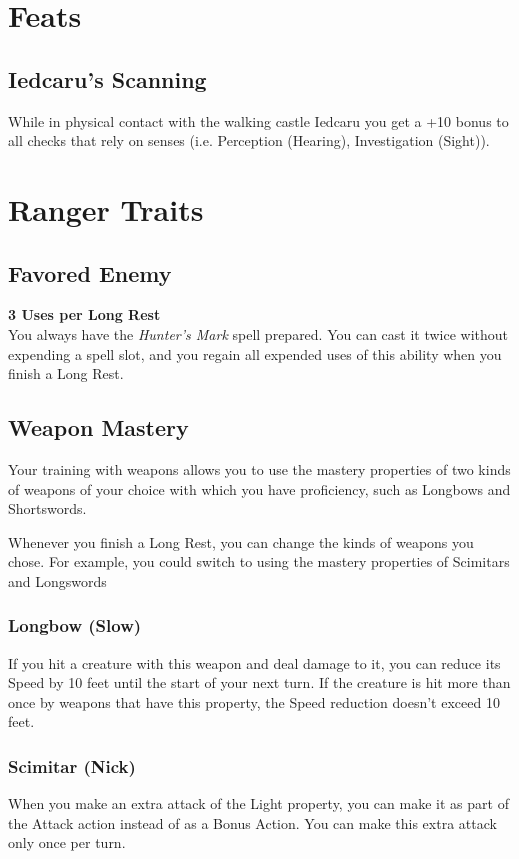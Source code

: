 \documentclass[letterpaper,openany,oneside,twocolumn]{book}
\begin{document}
\section*{Feats}
\subsection*{Iedcaru's Scanning}
While in physical contact with the walking castle Iedcaru you get a +10 bonus to all checks that rely on senses (i.e. Perception (Hearing), Investigation (Sight)).

\section*{Ranger Traits}
\subsection*{Favored Enemy}
\textbf{3 Uses per Long Rest}\\
You always have the \textit{Hunter's Mark} spell prepared. You can cast it twice without expending a spell slot, and you regain all expended uses of this ability when you finish a Long Rest.
\subsection*{Weapon Mastery}
Your training with weapons allows you to use the mastery properties of two kinds of weapons of your choice with which you have proficiency, such as Longbows and Shortswords.

Whenever you finish a Long Rest, you can change the kinds of weapons you chose. For example, you could switch to using the mastery properties of Scimitars and Longswords
\subsubsection*{Longbow (Slow)}
If you hit a creature with this weapon and deal damage to it, you can reduce its Speed by 10 feet until the start of your next turn. If the creature is hit more than once by weapons that have this property, the Speed reduction doesn't exceed 10 feet.
\subsubsection*{Scimitar (Nick)}
When you make an extra attack of the Light property, you can make it as part of the Attack action instead of as a Bonus Action. You can make this extra attack only once per turn.
\end{document}
